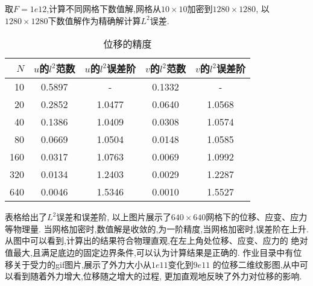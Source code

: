 \documentclass[a4paper, 11pt]{ctexart}
\begin{document}
取$F=1e12$,计算不同网格下数值解,网格从$10\times 10$加密到$1280\times 1280$,
以$1280\times 1280$下数值解作为精确解计算$L^2$误差.
\begin{table}[H]
\centering
\begin{tabular}{|r|c|c|c|c|} \hline
 $N$  & $u$的$l^2$范数& $u$的$l^2$误差阶 & $v$的$l^2$范数& $v$的$l^2$误差阶\\ \hline
 10	  & 0.5897 &  -     & 0.1332 &  -     \\
 20	  & 0.2852 & 1.0477 & 0.0640 & 1.0568 \\
 40	  & 0.1386 & 1.0409 & 0.0308 & 1.0574 \\
 80	  & 0.0669 & 1.0504 & 0.0148 & 1.0585 \\
 160	& 0.0317 & 1.0763 & 0.0069 & 1.0992 \\
 320	& 0.0134 & 1.2403 & 0.0029 & 1.2287 \\
 640	& 0.0046 & 1.5346 & 0.0010 & 1.5527 \\
	\hline
\end{tabular}
\caption{位移的精度}\label{tab:jingdu}
\end{table}

\begin{figure}[H]
  \centering
\end{figure}

\begin{figure}[H]
  \centering
\end{figure}

\begin{figure}[H]
  \centering
\end{figure}

\begin{figure}[H]
  \centering
\end{figure}

表格给出了$L^2$误差和误差阶,
以上图片展示了$640\times 640$网格下的位移、应变、应力等物理量.
当网格加密时,数值解是收敛的,为一阶精度,当网格加密时,误差阶在上升.
从图中可以看到,计算出的结果符合物理直观,在左上角处位移、应变、应力的
绝对值最大,且满足底边的固定边界条件,可以认为计算结果是正确的.
作业目录中有位移关于受力的gif图片,展示了外力大小从$1e11$变化到$9e11$
的位移二维纹影图,从中可以看到随着外力增大,位移随之增大的过程,
更加直观地反映了外力对位移的影响.
\end{document}
